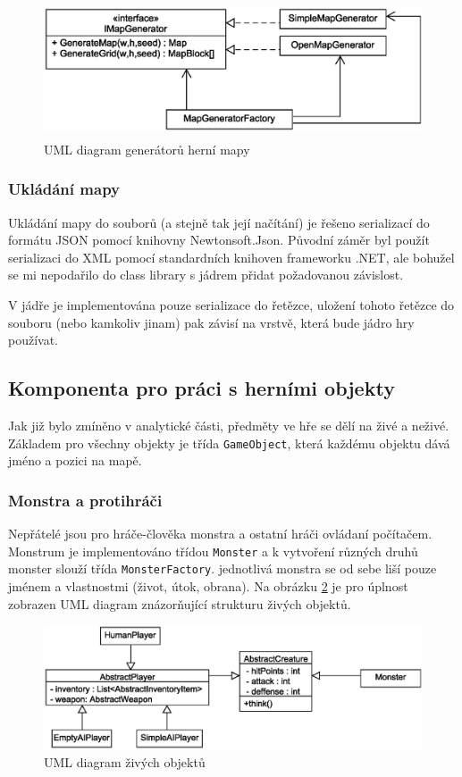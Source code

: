 \documentclass[11pt,a4paper]{scrartcl}
\begin{document}
	\begin{figure}[H]
		\centering
		\includegraphics[height=40mm]{core-map-generator-simple}
		\caption{UML diagram generátorů herní mapy}
		\label{fig:core-map-generator}
	\end{figure}
	
	\subsubsection{Ukládání mapy}
	Ukládání mapy do souborů (a stejně tak její načítání) je řešeno serializací do formátu JSON pomocí knihovny Newtonsoft.Json. Původní záměr byl použít serializaci do XML pomocí standardních knihoven frameworku .NET, ale bohužel se mi nepodařilo do class library s jádrem přidat požadovanou závislost.
	
	V jádře je implementována pouze serializace do řetězce, uložení tohoto řetězce do souboru (nebo kamkoliv jinam) pak závisí na vrstvě, která bude jádro hry používat.
	
	\subsection{Komponenta pro práci s herními objekty}
	Jak již bylo zmíněno v analytické části, předměty ve hře se dělí na živé a neživé. Základem pro všechny objekty je třída \verb|GameObject|, která každému objektu dává jméno a pozici na mapě.
	
	\subsubsection{Monstra a protihráči}
	Nepřátelé jsou pro hráče-člověka monstra a ostatní hráči ovládaní počítačem. Monstrum je implementováno třídou \verb|Monster| a k vytvoření různých druhů monster slouží třída \verb|MonsterFactory|. jednotlivá monstra se od sebe liší pouze jménem a vlastnostmi (život, útok, obrana). Na obrázku \ref{fig:core-creatures} je pro úplnost zobrazen UML diagram znázorňující strukturu živých objektů.
	
	\begin{figure}[H]
		\centering
		\includegraphics[width=140mm]{core-creatures-simple}
		\caption{UML diagram živých objektů}
		\label{fig:core-creatures}
	\end{figure}
	
\end{document}

